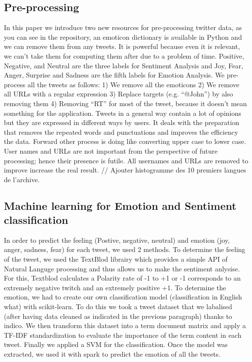 \documentclass{acmtog} %
\begin{document}
\subsection{Pre-processing}
\label{subsub:preprocessing}

In this paper we introduce two new resources for pre-processing twitter data, as you can see in the repository, an emoticon dictionary is available in Python and we can remove them from any tweets. It is powerful because even it is relevant, we can’t take them for computing them after due to a problem of time. Positive, Negative, and Neutral are the three labels for Sentiment Analysis and Joy, Fear, Anger, Surprise and Sadness are the fifth labels for Emotion Analysis. We pre-process all the tweets as follows:
1) We remove all the emoticons
2) We remove all URLs with a regular expression 
3) Replace targets (e.g. “@John”) by also removing them
4) Removing “RT” for most of the tweet, because it doesn’t mean something for the application. 
Tweets in a general way contain a lot of opinions but they are expressed in different ways by users. It deals with the preparation that removes the repeated words and punctuations and improves the efficiency the data. Forward other process is doing like converting upper case to lower case. User names and URLs are not important from the perspective of future processing; hence their presence is futile. All usernames and URLs are removed to improve increase the real result.
// Ajouter histogramme des 10 premiers langues de l’archive.


\subsection{Machine learning for Emotion and Sentiment classification}
\label{subsub:ml}

In order to predict the feeling (Postive, negative, neutral) and emotion (joy, anger, sadness, fear) for each tweet, we used 2 methods.
To determine the feeling of the tweet, we used the TextBlod librairy which provides a simple API of Natural Languge processing and thus allows us to make the sentiment anlysise. For this, Textblod calculates a Polarity rate of -1 to +1 or -1 corresponds to an extremely negative twitch and an extremely positive +1.
To determine the emotion, we had to create our own classification model (classification in English what) with scikit-learn.
To do this we took a tweet dataset that we labalised (after having data cleaned as indicated in the previous paragraph) thanks to indico.
We then transform this dataset into a term document matrix and apply a TF-IDF standardization to evaluate the importance of the term content in each tweet.
Finally we applied a SVM for the classification.
Once the model was extracted, we used it with spark to predict the emotion of all the tweets.
\end{document}
